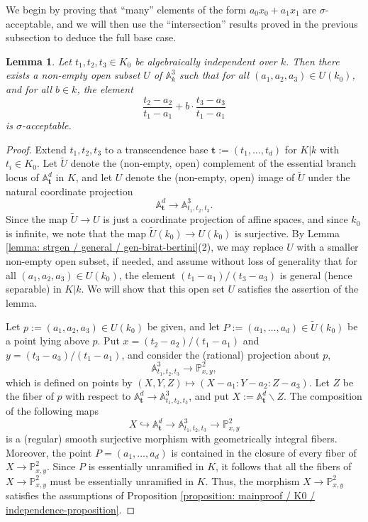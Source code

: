 \documentclass[11pt]{amsart}
\newtheorem{lemma}[proposition]{Lemma}
\theoremstyle{definition}
\theoremstyle{remark}
\numberwithin{equation}{section}
\newcommand{\Abb}{\mathbb{A}}
\newcommand{\Pbb}{\mathbb{P}}
\newcommand{\tbf}{\mathbf{t}}
\begin{document}
We begin by proving that ``many'' elements of the form $a_0 x_0 + a_1 x_1$ are $\sigma$-acceptable, and we will then use the ``intersection'' results proved in the previous subsection to deduce the full base case.
\begin{lemma}
\label{lemma: mainproof / base-case / pre-base-case}
  Let $t_1,t_2,t_3 \in K_0$ be algebraically independent over $k$.
  Then there exists a non-empty open subset $U$ of $\Abb^3_k$ such that for all $(a_1,a_2,a_3) \in U(k_0)$, and for all $b \in k$, the element
  \[ \frac{t_2-a_2}{t_1-a_1} + b \cdot \frac{t_3-a_3}{t_1-a_1}\]
  is $\sigma$-acceptable.
\end{lemma}
\begin{proof}
  Extend $t_1,t_2,t_3$ to a transcendence base $\tbf := (t_1,\ldots,t_d)$ for $K|k$ with $t_i \in K_0$.
  Let $\tilde U$ denote the (non-empty, open) complement of the essential branch locus of $\Abb^d_\tbf$ in $K$, and let $U$ denote the (non-empty, open) image of $\tilde U$ under the natural coordinate projection
  \[ \Abb^d_\tbf \rightarrow \Abb^3_{t_1,t_2,t_3}. \]
  Since the map $\tilde U \rightarrow U$ is just a coordinate projection of affine spaces, and since $k_0$ is infinite, we note that the map $\tilde U(k_0) \rightarrow U(k_0)$ is surjective.
  By Lemma \ref{lemma: strgen / general / gen-birat-bertini}(2), we may replace $U$ with a smaller non-empty open subset, if needed, and assume without loss of generality that for all $(a_1,a_2,a_3) \in U(k_0)$, the element $(t_1-a_1)/(t_3-a_3)$ is general (hence separable) in $K|k$.
  We will show that this open set $U$ satisfies the assertion of the lemma.
  
  Let $p := (a_1,a_2,a_3) \in U(k_0)$ be given, and let $P := (a_1,\ldots,a_d) \in \tilde U(k_0)$ be a point lying above $p$.
  Put $x = (t_2-a_2)/(t_1-a_1)$ and $y = (t_3-a_3)/(t_1-a_1)$, and consider the (rational) projection about $p$,
  \[ \Abb^3_{t_1,t_2,t_3} \rightarrow \Pbb^2_{x,y}, \]
  which is defined on points by $(X,Y,Z) \mapsto (X-a_1:Y-a_2:Z-a_3)$.
  Let $Z$ be the fiber of $p$ with respect to $\Abb^d_\tbf \rightarrow \Abb^3_{t_1,t_2,t_3}$, and put $X := \Abb^d_\tbf \smallsetminus Z$.
  The composition of the following maps
  \[ X \hookrightarrow \Abb^d_\tbf \rightarrow \Abb^3_{t_1,t_2,t_3} \rightarrow \Pbb^2_{x,y} \]
  is a (regular) smooth surjective morphism with geometrically integral fibers.
  Moreover, the point $P = (a_1,\ldots,a_d)$ is contained in the closure of every fiber of $X \rightarrow \Pbb^2_{x,y}$.
  Since $P$ is essentially unramified in $K$, it follows that all the fibers of $X \rightarrow \Pbb^2_{x,y}$ must be essentially unramified in $K$.
  Thus, the morphism $X \rightarrow \Pbb^2_{x,y}$ satisfies the assumptions of Proposition \ref{proposition: mainproof / K0 / independence-proposition}.


\end{proof}
\end{document}
